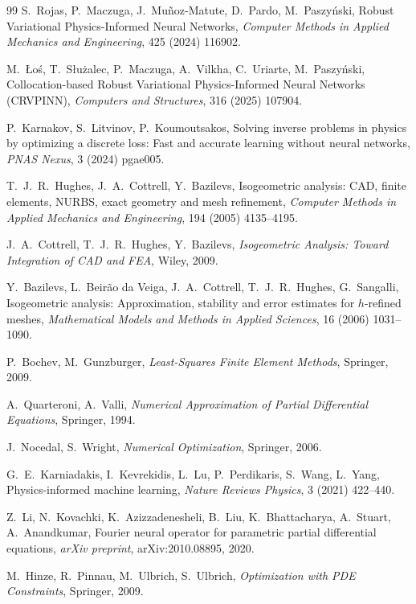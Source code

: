 \documentclass[review]{elsarticle}
\begin{document}
\begin{thebibliography}{99}
S.~Rojas, P.~Maczuga, J.~Mu\~noz-Matute, D.~Pardo, M.~Paszy\'nski,
Robust Variational Physics-Informed Neural Networks,
\emph{Computer Methods in Applied Mechanics and Engineering},
425 (2024) 116902.

M.~\L o\'s, T.~S\l u\.zalec, P.~Maczuga, A.~Vilkha, C.~Uriarte, M.~Paszy\'nski,
Collocation-based Robust Variational Physics-Informed Neural Networks (CRVPINN),
\emph{Computers and Structures},
316 (2025) 107904.

P.~Karnakov, S.~Litvinov, P.~Koumoutsakos,
Solving inverse problems in physics by optimizing a discrete loss: Fast and accurate learning without neural networks,
\emph{PNAS Nexus},
3 (2024) pgae005.

T.~J.~R.~Hughes, J.~A.~Cottrell, Y.~Bazilevs,
Isogeometric analysis: CAD, finite elements, NURBS, exact geometry and mesh refinement,
\emph{Computer Methods in Applied Mechanics and Engineering},
194 (2005) 4135--4195.

J.~A.~Cottrell, T.~J.~R.~Hughes, Y.~Bazilevs,
\emph{Isogeometric Analysis: Toward Integration of CAD and FEA},
Wiley, 2009.

Y.~Bazilevs, L.~Beir\~ao da Veiga, J.~A.~Cottrell, T.~J.~R.~Hughes, G.~Sangalli,
Isogeometric analysis: Approximation, stability and error estimates for $h$-refined meshes,
\emph{Mathematical Models and Methods in Applied Sciences},
16 (2006) 1031--1090.

P.~Bochev, M.~Gunzburger,
\emph{Least-Squares Finite Element Methods},
Springer, 2009.

A.~Quarteroni, A.~Valli,
\emph{Numerical Approximation of Partial Differential Equations},
Springer, 1994.

J.~Nocedal, S.~Wright,
\emph{Numerical Optimization},
Springer, 2006.

G.~E.~Karniadakis, I.~Kevrekidis, L.~Lu, P.~Perdikaris, S.~Wang, L.~Yang,
Physics-informed machine learning,
\emph{Nature Reviews Physics},
3 (2021) 422--440.

Z.~Li, N.~Kovachki, K.~Azizzadenesheli, B.~Liu, K.~Bhattacharya, A.~Stuart, A.~Anandkumar,
Fourier neural operator for parametric partial differential equations,
\emph{arXiv preprint},
arXiv:2010.08895, 2020.

M.~Hinze, R.~Pinnau, M.~Ulbrich, S.~Ulbrich,
\emph{Optimization with PDE Constraints},
Springer, 2009.


\end{thebibliography}
\end{document}

